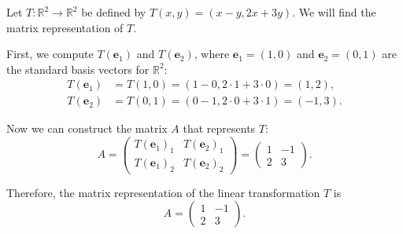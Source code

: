 \begin{example}\label{L1-ex:matT}
    Let $T: \mathbb{R}^2 \to \mathbb{R}^2$ be defined by $T(x, y) = (x - y, 2x + 3y)$. We will find the matrix representation of $T$.

    First, we compute $T(\mathbf{e}_1)$ and $T(\mathbf{e}_2)$, where $\mathbf{e}_1 = (1, 0)$ and $\mathbf{e}_2 = (0, 1)$ are the standard basis vectors for $\mathbb{R}^2$:
    \begin{align*}
        T(\mathbf{e}_1) &= T(1, 0) = (1 - 0, 2 \cdot 1 + 3 \cdot 0) = (1, 2), \\
        T(\mathbf{e}_2) &= T(0, 1) = (0 - 1, 2 \cdot 0 + 3 \cdot 1) = (-1, 3).
    \end{align*}

    Now we can construct the matrix $A$ that represents $T$:
    \[A = \begin{pmatrix}
        T(\mathbf{e}_1)_1 & T(\mathbf{e}_2)_1 \\
        T(\mathbf{e}_1)_2 & T(\mathbf{e}_2)_2
    \end{pmatrix} = \begin{pmatrix}
        1 & -1 \\
        2 & 3
    \end{pmatrix}.\]

    Therefore, the matrix representation of the linear transformation $T$ is
    \[A = \begin{pmatrix}
        1 & -1 \\
        2 & 3
    \end{pmatrix}.\]
\end{example}

